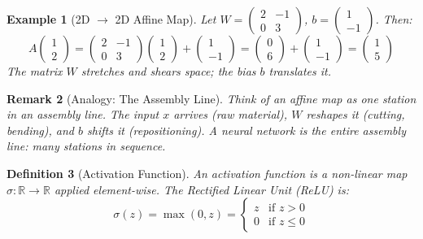 \documentclass[10pt,twocolumn]{article}
\newtheorem{definition}{Definition}[section]
\newtheorem{remark}[definition]{Remark}
\newtheorem{example}[definition]{Example}
\begin{document}
\begin{example}[2D $\to$ 2D Affine Map]
Let $W = \begin{pmatrix} 2 & -1 \\ 0 & 3 \end{pmatrix}$, $b = \begin{pmatrix} 1 \\ -1 \end{pmatrix}$. Then:
\[
A\begin{pmatrix} 1 \\ 2 \end{pmatrix} = \begin{pmatrix} 2 & -1 \\ 0 & 3 \end{pmatrix}\begin{pmatrix} 1 \\ 2 \end{pmatrix} + \begin{pmatrix} 1 \\ -1 \end{pmatrix} = \begin{pmatrix} 0 \\ 6 \end{pmatrix} + \begin{pmatrix} 1 \\ -1 \end{pmatrix} = \begin{pmatrix} 1 \\ 5 \end{pmatrix}
\]
The matrix $W$ stretches and shears space; the bias $b$ translates it.
\end{example}

\begin{remark}[Analogy: The Assembly Line]
Think of an affine map as one station in an assembly line. The input $x$ arrives (raw material), $W$ reshapes it (cutting, bending), and $b$ shifts it (repositioning). A neural network is the entire assembly line: many stations in sequence.
\end{remark}

\begin{definition}[Activation Function]
An activation function is a non-linear map $\sigma: \mathbb{R} \to \mathbb{R}$ applied element-wise. The Rectified Linear Unit (ReLU) is:
\begin{equation}
\sigma(z) = \max(0, z) = \begin{cases} z & \text{if } z > 0 \\ 0 & \text{if } z \leq 0 \end{cases}
\end{equation}
\end{definition}
\end{document}
